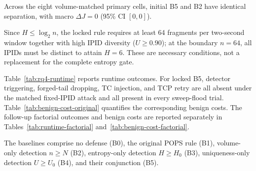 Across the eight volume-matched primary cells, initial B5 and B2 have identical
separation, with macro $\Delta J=0$ (95\% CI $[0,0]$).

Since $H\leq\log_2 n$, the locked rule requires at least 64 fragments per
two-second window together with high IPID diversity ($U\geq0.90$); at the
boundary $n=64$, all IPIDs must be distinct to attain $H=6$.
These are necessary conditions, not a replacement for the complete entropy gate.

Table~\ref{tab:rq4-runtime} reports runtime outcomes.
For locked B5, detector triggering, forged-tail dropping, TC injection, and
TCP retry are all absent under the matched fixed-IPID attack and all present
in every sweep-flood trial.
Table~\ref{tab:benign-cost-original} quantifies the corresponding benign costs.
The follow-up factorial outcomes and benign costs are reported separately in
Tables~\ref{tab:runtime-factorial} and~\ref{tab:benign-cost-factorial}.

The baselines comprise no defense (B0), the original POPS rule (B1),
volume-only detection $n\geq N$ (B2), entropy-only detection $H\geq H_0$ (B3),
uniqueness-only detection $U\geq U_0$ (B4), and their conjunction (B5).
